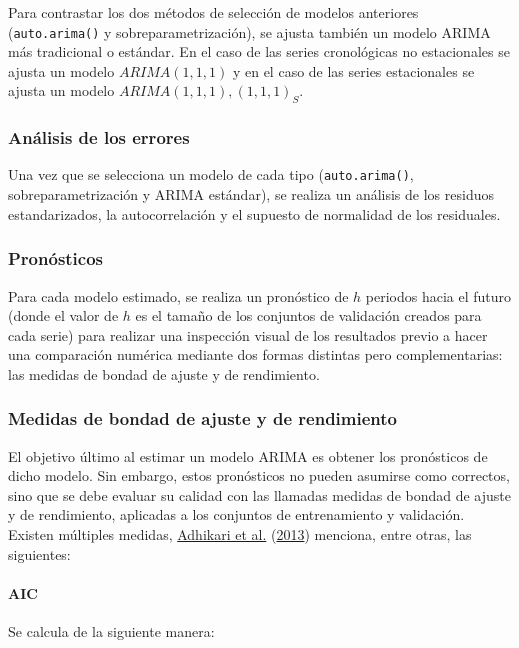 \documentclass[
]{article}
\begin{document}
Para contrastar los dos métodos de selección de modelos anteriores
(\texttt{auto.arima()} y sobreparametrización), se ajusta también un
modelo ARIMA más tradicional o estándar. En el caso de las series
cronológicas no estacionales se ajusta un modelo \(ARIMA(1,1,1)\) y en
el caso de las series estacionales se ajusta un modelo
\(ARIMA(1,1,1),(1,1,1)_S\).

\subsubsection{Análisis de los errores}

Una vez que se selecciona un modelo de cada tipo (\texttt{auto.arima()},
sobreparametrización y ARIMA estándar), se realiza un análisis de los
residuos estandarizados, la autocorrelación y el supuesto de normalidad
de los residuales.

\subsubsection{Pronósticos}

Para cada modelo estimado, se realiza un pronóstico de \(h\) periodos
hacia el futuro (donde el valor de \(h\) es el tamaño de los conjuntos
de validación creados para cada serie) para realizar una inspección
visual de los resultados previo a hacer una comparación numérica
mediante dos formas distintas pero complementarias: las medidas de
bondad de ajuste y de rendimiento.

\subsubsection{Medidas de bondad de ajuste y de rendimiento}

El objetivo último al estimar un modelo ARIMA es obtener los pronósticos
de dicho modelo. Sin embargo, estos pronósticos no pueden asumirse como
correctos, sino que se debe evaluar su calidad con las llamadas medidas
de bondad de ajuste y de rendimiento, aplicadas a los conjuntos de
entrenamiento y validación. Existen múltiples medidas,
\protect\hyperlink{ref-medidas}{Adhikari et al.}
(\protect\hyperlink{ref-medidas}{2013}) menciona, entre otras, las
siguientes:

\paragraph{AIC}

Se calcula de la siguiente manera:
\end{document}
